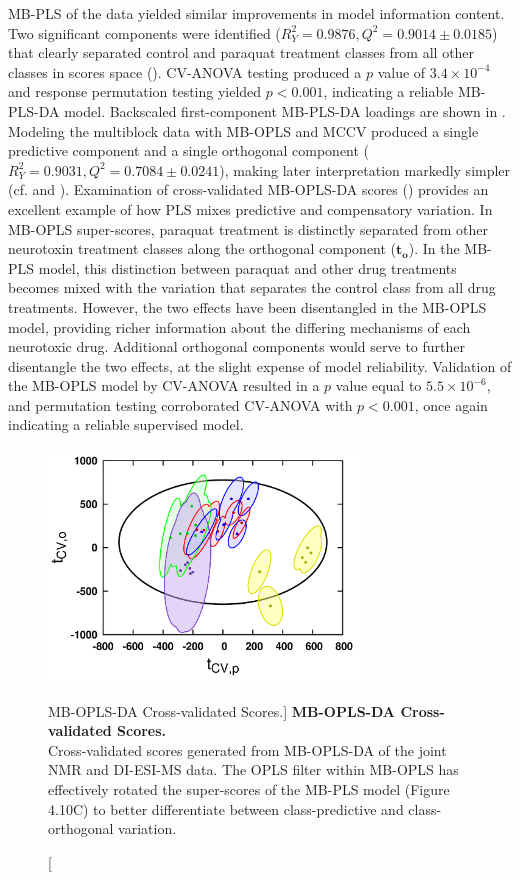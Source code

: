 \begin{doublespace}
MB-PLS of the data yielded similar improvements in model information content.
Two significant components were identified
($R^2_Y = 0.9876, Q^2 = 0.9014 \pm 0.0185$) that clearly separated control and
paraquat treatment classes from all other classes in scores space
(). CV-ANOVA testing produced a $p$ value
of $3.4 \times 10^{-4}$ and response permutation testing yielded
$p < 0.001$, indicating a reliable MB-PLS-DA model. Backscaled
first-component MB-PLS-DA loadings are shown in .
Modeling the multiblock data with MB-OPLS and MCCV produced a
single predictive component and a single orthogonal component
($R^2_Y = 0.9031, Q^2 = 0.7084 \pm 0.0241$), making later interpretation
markedly simpler (cf.  and ).
Examination of cross-validated MB-OPLS-DA scores
() provides an excellent example of how PLS mixes
predictive and compensatory variation. In MB-OPLS super-scores, paraquat
treatment is distinctly separated from other neurotoxin treatment classes along
the orthogonal component ($\mathbf{t_o}$). In the MB-PLS model, this
distinction between paraquat and other drug treatments becomes mixed with the
variation that separates the control class from all drug treatments. However,
the two effects have been disentangled in the MB-OPLS model, providing richer
information about the differing mechanisms of each neurotoxic drug. Additional
orthogonal components would serve to further disentangle the two effects, at
the slight expense of model reliability. Validation of the MB-OPLS model by
CV-ANOVA resulted in a $p$ value equal to $5.5 \times 10^{-6}$, and permutation
testing corroborated CV-ANOVA with $p < 0.001$, once again indicating a
reliable supervised model.
\end{doublespace}

\begin{figure}
\includegraphics[width=3.25in]{figs/apps/14-mbopls-t.png}
\caption
      [MB-OPLS-DA Cross-validated Scores.]{
  {\bf MB-OPLS-DA Cross-validated Scores.}
  \\
  Cross-validated scores generated from MB-OPLS-DA of the joint \hnmr{} NMR
  and DI-ESI-MS data. The OPLS filter within MB-OPLS has effectively rotated
  the super-scores of the MB-PLS model (Figure 4.10C) to better differentiate
  between class-predictive and class-orthogonal variation.
}
\label{figure.4.14}
\end{figure}

